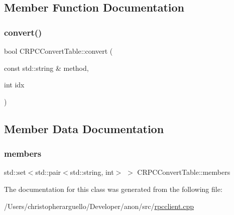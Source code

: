 \subsection{Member Function Documentation}
\mbox{\label{class_c_r_p_c_convert_table_a034b770cb03e79074111b85eba889e58}} 
\subsubsection{\texorpdfstring{convert()}{convert()}}
{\footnotesize\ttfamily bool C\+R\+P\+C\+Convert\+Table\+::convert (\begin{DoxyParamCaption}\item[{const std\+::string \&}]{method,  }\item[{int}]{idx }\end{DoxyParamCaption})\hspace{0.3cm}{\ttfamily [inline]}}



\subsection{Member Data Documentation}
\mbox{\label{class_c_r_p_c_convert_table_a6fa71fee177e85db3846acbb7b9c6025}} 
\subsubsection{\texorpdfstring{members}{members}}
{\footnotesize\ttfamily std\+::set$<$std\+::pair$<$std\+::string, int$>$ $>$ C\+R\+P\+C\+Convert\+Table\+::members\hspace{0.3cm}{\ttfamily [private]}}



The documentation for this class was generated from the following file\+:\begin{DoxyCompactItemize}
\item 
/\+Users/christopherarguello/\+Developer/anon/src/\mbox{\hyperlink{rpcclient_8cpp}{rpcclient.\+cpp}}\end{DoxyCompactItemize}
